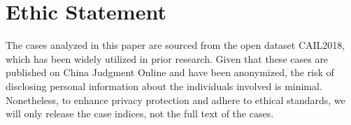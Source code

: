 \section*{Ethic Statement}
The cases analyzed in this paper are sourced from the open dataset CAIL2018, which has been widely utilized in prior research. Given that these cases are published on China Judgment Online and have been anonymized, the risk of disclosing personal information about the individuals involved is minimal. Nonetheless, to enhance privacy protection and adhere to ethical standards, we will only release the case indices, not the full text of the cases.
